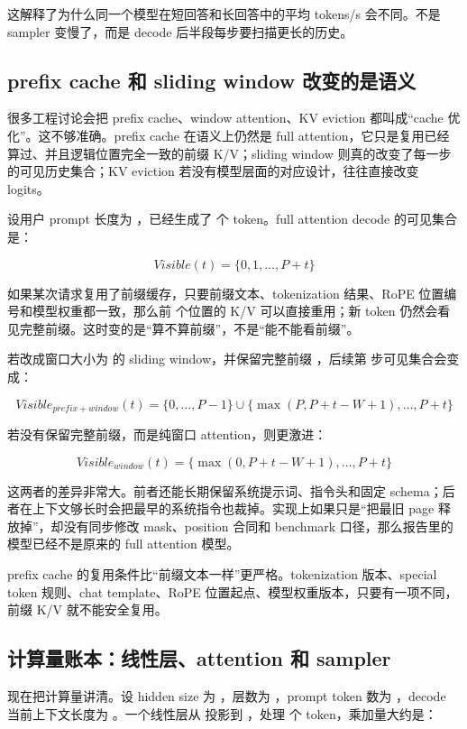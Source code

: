 这解释了为什么同一个模型在短回答和长回答中的平均 tokens/s 会不同。不是 sampler 变慢了，而是 decode 后半段每步要扫描更长的历史。

\subsection{prefix cache 和 sliding window 改变的是语义}

很多工程讨论会把 prefix cache、window attention、KV eviction 都叫成“cache 优化”。这不够准确。prefix cache 在语义上仍然是 full attention，它只是复用已经算过、并且逻辑位置完全一致的前缀 K/V；sliding window 则真的改变了每一步的可见历史集合；KV eviction 若没有模型层面的对应设计，往往直接改变 logits。

设用户 prompt 长度为 ，已经生成了  个 token。full attention decode 的可见集合是：

\[
Visible(t)=\{0,1,\dots,P+t\}
\]

如果某次请求复用了前缀缓存，只要前缀文本、tokenization 结果、RoPE 位置编号和模型权重都一致，那么前  个位置的 K/V 可以直接重用；新 token 仍然会看见完整前缀。这时变的是“算不算前缀”，不是“能不能看前缀”。

若改成窗口大小为  的 sliding window，并保留完整前缀 ，后续第  步可见集合会变成：

\[
Visible_{prefix+window}(t)=
\{0,\dots,P-1\} \cup
\{\max(P, P+t-W+1), \dots, P+t\}
\]

若没有保留完整前缀，而是纯窗口 attention，则更激进：

\[
Visible_{window}(t)=
\{\max(0, P+t-W+1), \dots, P+t\}
\]

这两者的差异非常大。前者还能长期保留系统提示词、指令头和固定 schema；后者在上下文够长时会把最早的系统指令也裁掉。实现上如果只是“把最旧 page 释放掉”，却没有同步修改 mask、position 合同和 benchmark 口径，那么报告里的模型已经不是原来的 full attention 模型。

\begin{warningbox}
prefix cache 的复用条件比“前缀文本一样”更严格。tokenization 版本、special token 规则、chat template、RoPE 位置起点、模型权重版本，只要有一项不同，前缀 K/V 就不能安全复用。
\end{warningbox}

\subsection{计算量账本：线性层、attention 和 sampler}

现在把计算量讲清。设 hidden size 为 ，层数为 ，prompt token 数为 ，decode 当前上下文长度为 。一个线性层从  投影到 ，处理  个 token，乘加量大约是：

